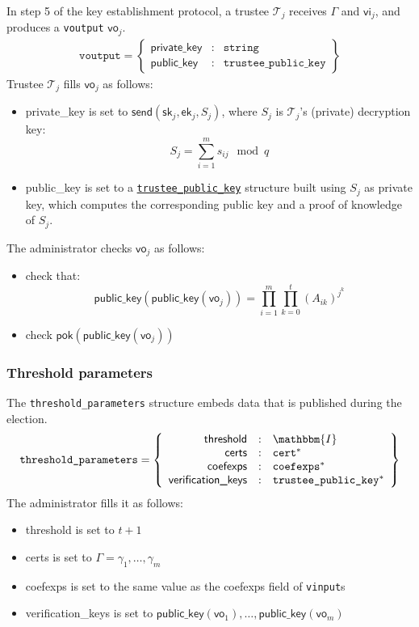 \documentclass[a4paper]{article}
\newcommand{\I}{\mathbbm{I}}
\newcommand{\jstring}{\texttt{string}}
\begin{document}
In step 5 of the key establishment protocol, a trustee $\mathcal{T}_j$ receives
$\Gamma$ and $\textsf{vi}_j$, and produces a \texttt{voutput}
$\textsf{vo}_j$.
\begin{gather*}
  \texttt{voutput}=\left\{
    \begin{array}{rcl}
      \textsf{private\_key}&:&\jstring\\
      \textsf{public\_key}&:&\texttt{trustee\_public\_key}
    \end{array}
  \right\}
\end{gather*}
Trustee $\mathcal{T}_j$ fills $\textsf{vo}_j$ as follows:
\begin{itemize}
\item \textsf{private\_key} is set to
  $\textsf{send}(\textsf{sk}_j,\textsf{ek}_j,S_j)$, where $S_j$ is $\mathcal{T}_j$'s
  (private) decryption key:
  \[
    S_j=\sum_{i=1}^m s_{ij}\mod q
  \]
\item \textsf{public\_key} is set to a
  \hyperref[trustee-keys]{\texttt{trustee\_public\_key}} structure
  built using $S_j$ as private key, which computes the corresponding
  public key and a proof of knowledge of $S_j$.
\end{itemize}
The administrator checks $\textsf{vo}_j$ as follows:
\begin{itemize}
\item check that:
  \[
    \textsf{public\_key}(\textsf{public\_key}(\textsf{vo}_j))=\prod_{i=1}^m \prod_{k=0}^t (A_{ik})^{j^k}
  \]
\item check $\textsf{pok}(\textsf{public\_key}(\textsf{vo}_j))$
\end{itemize}

\subsubsection{Threshold parameters}
\label{threshold-params}

The \texttt{threshold\_parameters} structure embeds data that is
published during the election.
\begin{gather*}
  \texttt{threshold\_parameters}=\left\{
    \begin{array}{rcl}
      \textsf{threshold}&:&\I\\
      \textsf{certs}&:&\texttt{cert}^\ast\\
      \textsf{coefexps}&:&\texttt{coefexps}^\ast\\
      \textsf{verification\_keys}&:&\texttt{trustee\_public\_key}^\ast
    \end{array}
  \right\}
\end{gather*}
The administrator fills it as follows:
\begin{itemize}
\item \textsf{threshold} is set to $t+1$
\item \textsf{certs} is set to $\Gamma=\gamma_1,\dotsc,\gamma_m$
\item \textsf{coefexps} is set to the same value as the
  \textsf{coefexps} field of \texttt{vinput}s
\item \textsf{verification\_keys} is set to
  $\textsf{public\_key}(\textsf{vo}_1),\dotsc,\textsf{public\_key}(\textsf{vo}_m)$
\end{itemize}
\end{document}
